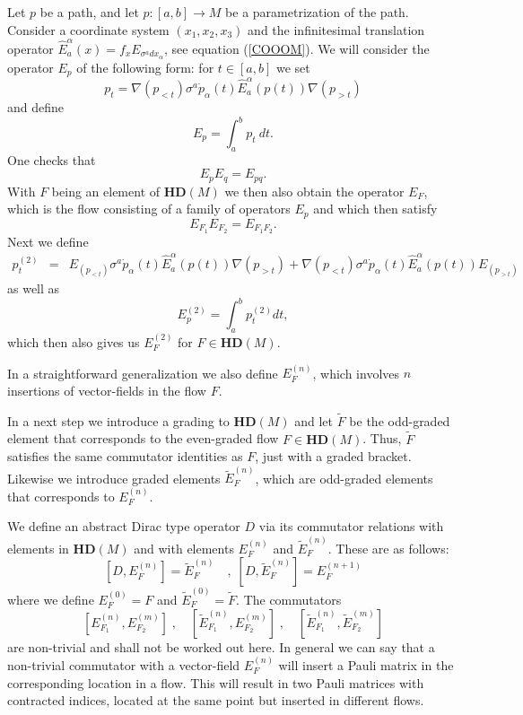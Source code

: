 \documentclass[12pt]{article}
\newcommand{\nn}{\nonumber}
\def\a{\alpha}
\begin{document}
Let $p$ be a path, and let $p:[a,b]\to M$ be a parametrization of the path. 
Consider a coordinate system $(x_1,x_2,x_3)$ and the infinitesimal translation operator $\hat{E}^\a_a(x) = f_x E_{\sigma^a dx_\a}$, see equation (\ref{COOOM}). We will consider the operator $E_{p}$ of the following form: for $t\in [a,b]$ we set 
$$
p_t=\nabla ({p_{<t} }) \sigma^a \dot{p}_\a(t)   \hat{E}^\a_a (p(t))\nabla( {p_{>t} })  
$$
and define
$$E_{p} =\int_{a}^b {p}_t\  dt .$$
One checks that 
$$
{E}_{p} {E}_{q} = {E}_{pq}.  
$$
With $F$ being an element of $\mathbf{HD}(M)$ we then also obtain the operator $E_F$, which is the flow consisting of a family of operators $E_p$ and which then satisfy
$$
E_{F_1}E_{F_2} = E_{F_1 F_2}.
$$
%
%
Next we define 
\begin{eqnarray}
{p}^{(2)}_{t}&=& E_{(p_{<t} )} \sigma^{a} \dot{p}_\a(t)     \hat{E}^{\a}_{a} (p(t))  \nabla( {p_{>t}} ) 
  + \nabla(p_{<t} )  \sigma^{a} \dot{p}_\a(t)     \hat{E}^{\a}_{a} (p(t))  E_{(p_{>t})}  
\nn
\end{eqnarray}
as well as
$${E}^{(2)}_{p} =\int_{a}^b {p}^{(2)}_{t}  dt ,$$
which then also gives us $E^{(2)}_F$ for $F\in \mathbf{HD}(M)$.

In a straightforward generalization we also define $E_F^{(n)}$, which involves $n$ insertions of vector-fields in the flow $F$.

In a next step we introduce a grading to $\mathbf{HD}(M)$ and let $\tilde{F}$ be the odd-graded element that corresponds to the even-graded flow $F\in\mathbf{HD}(M)$. Thus, $\tilde{F}$ satisfies the same commutator identities as $F$, just with a graded bracket. Likewise we introduce graded elements $\tilde{E}_F^{(n)}$, which are odd-graded elements that corresponds to ${E}_F^{(n)}$.

We define an abstract Dirac type operator $D$ via its commutator relations with elements in $\mathbf{HD}(M)$ and with elements ${E}_F^{(n)}$ and $\tilde{E}_F^{(n)}$. These are as follows:
$$
\left[ D  ,  E^{(n)}_F  \right] = \tilde{E}_F^{(n)}
\quad,\;
\left[ D  ,  \tilde{E}_F^{(n)}  \right] = E_{F}^{(n+1)}
\nn
$$
 where we define $E^{(0)}_F= F$ and $\tilde{E}_F^{(0)}=\tilde{F}$. The commutators 
 $$[ E^{(n)}_{F_1} ,  E^{(m)}_{F_2} ]\;,\quad [ \tilde{E}^{(n)}_{F_1} ,  E^{(m)}_{F_2} ]\;,\quad [ \tilde{E}^{(n)}_{F_1} ,  \tilde{E}^{(m)}_{F_2} ]$$ are non-trivial and shall not be worked out here. In general we can say that a non-trivial commutator with a vector-field $E^{(n)}_{F} $ will insert a Pauli matrix in the corresponding location in a flow. This will result in two Pauli matrices with contracted indices, located at the same point but inserted in different flows.
 
\end{document}
